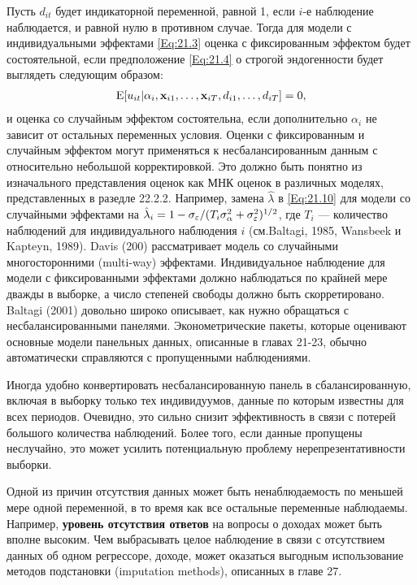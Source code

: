 Пусть $d_{it}$ будет индикаторной переменной, равной 1, если $i$-е наблюдение наблюдается, и равной нулю в противном случае. Тогда для модели с индивидуальными эффектами \ref{Eq:21.3} оценка с фиксированным эффектом будет состоятельной, если  предположение \ref{Eq:21.4} о строгой эндогенности будет выглядеть следующим образом:
 \begin{align}
\mathrm E[u_{it}|\alpha_i, \mathbf{x}_{i1}, \dots, \mathbf{x}_{iT}, d_{i1}, \dots, d_{iT}]=0,
\label{Eq:21.54}
\end{align}
и оценка со случайным эффектом состоятельна, если дополнительно $\alpha_i$ не зависит от остальных переменных условия. Оценки с фиксированным и случайным эффектом могут применяться к несбалансированным данным с относительно небольшой корректировкой. Это должно быть понятно из изначального представления оценок как МНК оценок в различных моделях, представленных в разедле 22.2.2. Например, замена $\hat{\lambda}$ в \ref{Eq:21.10} для модели со случайными эффектами на $\hat{\lambda}_i=1-\sigma_\varepsilon/(T_i\sigma^2_\alpha+\sigma^2_\varepsilon)^{1/2}$, где $T_i$ --- количество наблюдений для индивидуального наблюдения $i$ (см.Baltagi, 1985, Wansbeek и Kapteyn, 1989). Davis (200) рассматривает модель со случайными многосторонними (multi-way) эффектами. Индивидуальное наблюдение для модели с фиксированными эффектами должно наблюдаться по крайней мере дважды в выборке, а число степеней свободы должно быть скорретировано. Baltagi (2001) довольно широко описывает, как нужно обращаться с несбалансированными панелями. Эконометрические пакеты, которые оценивают основные  модели панельных данных, описанные в главах 21-23, обычно автоматически справляются с пропущенными наблюдениями.

Иногда удобно конвертировать несбалансированную панель в сбалансированную, включая в выборку только тех индивидуумов, данные по которым известны для всех периодов. Очевидно, это сильно снизит эффективность в связи с потерей большого количества наблюдений. Более того, если данные пропущены неслучайно, это может усилить потенциальную проблему нерепрезентативности выборки.

Одной из причин отсутствия данных может быть ненаблюдаемость по меньшей мере одной переменной, в то время как все остальные переменные наблюдаемы. Например, \textbf{уровень отсутствия ответов} на вопросы о доходах может быть вполне высоким. Чем выбрасывать целое наблюдение в связи с отсутствием данных об одном регрессоре, доходе, может оказаться выгодным использование методов подстановки (imputation methods), описанных в главе 27.

